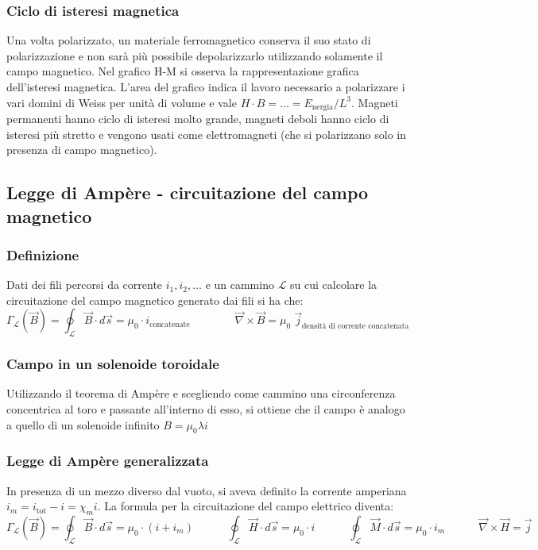 \documentclass[a4paper]{article}
\newcommand\nab{\vec{\nabla}} %
\begin{document}
\subsubsection*{Ciclo di isteresi magnetica}
Una volta polarizzato, un materiale ferromagnetico conserva il suo stato di polarizzazione e non sarà più possibile depolarizzarlo
utilizzando solamente il campo magnetico. Nel grafico H-M si osserva la rappresentazione grafica dell'isteresi magnetica. L'area
del grafico indica il lavoro necessario a polarizzare i vari domini di Weiss per unità di volume e vale \(H \cdot B = \dots = E_\text{nergia}/L^3\).
Magneti permanenti hanno ciclo di isteresi molto grande, magneti deboli hanno ciclo di isteresi più stretto e vengono usati come
elettromagneti (che si polarizzano solo in presenza di campo magnetico).

\subsection{Legge di Ampère - circuitazione del campo magnetico}
\subsubsection*{Definizione}
Dati dei fili percorsi da corrente \(i_1, i_2, \dots\) e un cammino \(\mathcal{L}\) su cui calcolare la circuitazione del campo
magnetico generato dai fili si ha che:
\[\Gamma_\mathcal{L} (\vec{B}) = \oint_\mathcal{L} \vec{B} \cdot d\vec{s} = \mu_0 \cdot i_\text{concatenate} \qquad \qquad \nab \times \vec{B} = \mu_0 \; \vec{j}_\text{densità di corrente concatenata}\]

\subsubsection*{Campo in un solenoide toroidale}
Utilizzando il teorema di Ampère e scegliendo come cammino una circonferenza concentrica al toro e passante all'interno di esso,
si ottiene che il campo è analogo a quello di un solenoide infinito \(B = \mu_0 \lambda i\)

\subsubsection*{Legge di Ampère generalizzata}
In presenza di un mezzo diverso dal vuoto, si aveva definito la corrente amperiana \(i_m = i_\text{tot} - i = \chi_m i\). La
formula per la circuitazione del campo elettrico diventa:
\[\Gamma_\mathcal{L} (\vec{B}) = \oint_\mathcal{L} \vec{B} \cdot d\vec{s} = \mu_0 \cdot (i + i_m) \qquad\quad \oint_\mathcal{L} \vec{H} \cdot d\vec{s} = \mu_0 \cdot i \qquad\quad \oint_\mathcal{L} \vec{M} \cdot d\vec{s} = \mu_0 \cdot i_m \qquad\quad \nab \times \vec{H} = \vec{j}\]
\end{document}
